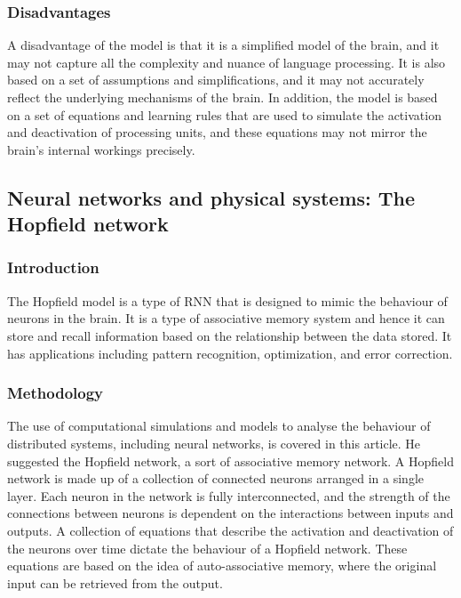 \subsubsection{Disadvantages}
A disadvantage of the model is that it is a simplified model of the brain, and
it may not capture all the complexity and nuance of language processing. It is
also based on a set of assumptions and simplifications, and it may not
accurately reflect the underlying mechanisms of the brain. In addition, the
model is based on a set of equations and learning rules that are used to
simulate the activation and deactivation of processing units, and these
equations may not mirror the brain's internal workings precisely.

\subsection{Neural networks and physical systems: The Hopfield network}
\subsubsection{Introduction}
The Hopfield model\cite{hopfield} is a type of RNN that is designed to mimic
the behaviour of neurons in the brain. It is a type of associative memory
system and hence it can store and recall information based on the relationship
between the data stored. It has applications including pattern recognition,
optimization, and error correction.
\subsubsection{Methodology}
The use of computational simulations and models to analyse the behaviour of
distributed systems, including neural networks, is covered in this article. He
suggested the Hopfield network, a sort of associative memory network. A
Hopfield network is made up of a collection of connected neurons arranged in a
single layer. Each neuron in the network is fully interconnected, and the
strength of the connections between neurons is dependent on the interactions
between inputs and outputs. A collection of equations that describe the
activation and deactivation of the neurons over time dictate the behaviour of a
Hopfield network. These equations are based on the idea of auto-associative
memory, where the original input can be retrieved from the output.
